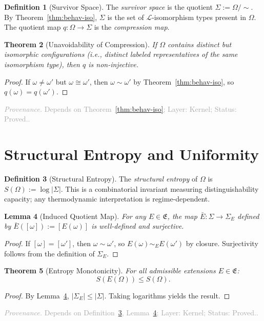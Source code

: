 \documentclass[11pt,a4paper]{article}
\newtheorem{theorem}{Theorem}[section]
\newtheorem{lemma}[theorem]{Lemma}
\theoremstyle{definition}
\newtheorem{definition}[theorem]{Definition}
\theoremstyle{remark}
\newcommand{\assumptionfooter}[3]{%
  \par\smallskip\noindent\textcolor{darkgray}{\footnotesize\textit{Provenance.} Depends on #1; Layer: #2; Status: #3.}\par\medskip
}
\begin{document}
\begin{definition}[Survivor Space]\label{def:survivor}
The \emph{survivor space} is the quotient $\Sigma := \Omega / {\sim}$. By Theorem~\ref{thm:behav-iso}, $\Sigma$ is the set of $\mathcal{L}$-isomorphism types present in $\Omega$. The quotient map $q \colon \Omega \to \Sigma$ is the \emph{compression map}.
\end{definition}

\begin{theorem}[Unavoidability of Compression]\label{thm:compress}
If $\Omega$ contains distinct but isomorphic configurations (i.e., distinct labeled representatives of the same isomorphism type), then $q$ is non-injective.
\end{theorem}
\begin{proof}
If $\omega \neq \omega'$ but $\omega \cong \omega'$, then $\omega \sim \omega'$ by Theorem~\ref{thm:behav-iso}, so $q(\omega) = q(\omega')$.
\end{proof}
\assumptionfooter{Theorem~\ref{thm:behav-iso}}{Kernel}{Proved.}

\section{Structural Entropy and Uniformity}

\begin{definition}[Structural Entropy]\label{def:entropy}
The \emph{structural entropy} of $\Omega$ is $S(\Omega) := \log |\Sigma|$. This is a combinatorial invariant measuring distinguishability capacity; any thermodynamic interpretation is regime-dependent.
\end{definition}

\begin{lemma}[Induced Quotient Map]\label{lem:quotient}
For any $E \in \mathfrak{E}$, the map $\bar{E} \colon \Sigma \to \Sigma_E$ defined by $\bar{E}([\omega]) := [E(\omega)]$ is well-defined and surjective.
\end{lemma}
\begin{proof}
If $[\omega] = [\omega']$, then $\omega \sim \omega'$, so $E(\omega) \sim_E E(\omega')$ by closure. Surjectivity follows from the definition of $\Sigma_E$.
\end{proof}

\begin{theorem}[Entropy Monotonicity]\label{thm:entropy}
For all admissible extensions $E \in \mathfrak{E}$:
\[
  S(E(\Omega)) \leq S(\Omega).
\]
\end{theorem}
\begin{proof}
By Lemma~\ref{lem:quotient}, $|\Sigma_E| \leq |\Sigma|$. Taking logarithms yields the result.
\end{proof}
\assumptionfooter{Definition~\ref{def:entropy}, Lemma~\ref{lem:quotient}}{Kernel}{Proved.}
\end{document}
